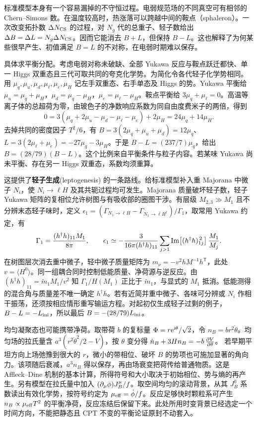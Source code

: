 标准模型本身有一个容易漏掉的不守恒过程。电弱规范场的不同真空可有相邻的 Chern--Simons 数。在温度较高时，热涨落可以跨越中间的鞍点（sphaleron）。一次改变拓扑数 $\Delta N_{\rm CS}$ 的过程，对 $N_g$ 代的总重子、轻子数给出 $\Delta B=\Delta L=N_g\Delta N_{\rm CS}$。因而它能消去 $B+L$，但保持 $B-L$。这也解释了为何某些很早产生、初值满足 $B=L$ 的不对称，在电弱时期难以保存。

具体求平衡分配。考虑电弱对称未破缺、全部 Yukawa 反应与鞍点跃迁都快、单一 Higgs 双重态且三代可取共同的夸克化学势。为简化令各代轻子化学势相同。用 $\mu_q,\mu_u,\mu_d,\mu_\ell,\mu_e,\mu_H$ 记左手双重态、右手单态及 Higgs 的势。Yukawa 平衡给 $\mu_u=\mu_q+\mu_H$，$\mu_d=\mu_q-\mu_H$，$\mu_e=\mu_\ell-\mu_H$。鞍点平衡给 $3\mu_q+\mu_\ell=0$。高温等离子体的总超荷为零，由玻色子的净数响应系数为同自由度费米子的两倍，得到
\[
 0=3(\mu_q+2\mu_u-\mu_d-\mu_\ell-\mu_e)+2\mu_H
   =24\mu_q+14\mu_H .
\]
去掉共同的密度因子 $T^2/6$，有 $B=3(2\mu_q+\mu_u+\mu_d)=12\mu_q$、$L=3(2\mu_\ell+\mu_e)=-27\mu_q-3\mu_H$。于是 $B-L=(237/7)\mu_q$，给出 $B=(28/79)(B-L)$。这个比例来自平衡条件与粒子内容。若某味 Yukawa 尚未平衡、存在另一 Higgs 双重态，系数均须重算。

这提供了\textbf{轻子生成}(leptogenesis) 的一条路线。给标准模型补入重 Majorana 中微子 $N_i$，使 $N_i\to\ell H$ 及其共轭过程均可发生。Majorana 质量破坏轻子数，轻子 Yukawa 矩阵的复相位允许树图与有吸收部的圈图干涉。有层级 $M_{2,3}\gg M_1$ 且不分辨末态轻子味时，定义 $\epsilon_1=(\Gamma_{N_1\to\ell H}-\Gamma_{N_1\to\bar\ell H^\dagger})/\Gamma_1$，取常用 Yukawa 约定，有
\[
 \Gamma_1=\frac{(h^\dagger h)_{11}M_1}{8\pi},\qquad
 \epsilon_1\simeq-\frac{3}{16\pi(h^\dagger h)_{11}}
 \sum_{j>1}{\rm Im}\!\left[(h^\dagger h)_{1j}^{\,2}\right]\frac{M_1}{M_j}.
\]
在树图层次消去重中微子，轻中微子质量矩阵为 $m_\nu=-v^2 h M^{-1}h^{\mathsf T}$，此处 $v=\langle H^0\rangle$。同一组耦合同时控制低能质量、净荷源与逆反应。由 $(h^\dagger h)_{11}=\widetilde m_1 M_1/v^2$ 知 $\Gamma_1/H(M_1)$ 正比于 $\widetilde m_1$，与显式的 $M_1$ 抵消。低能测得的混合角与质量差不唯一确定 $h^\dagger h$。若有近简并重中微子、各味可分辨或 $N_i$ 作相干振荡，还须按相应情形重写输运方程。对起初仅生成轻子过剩的例子，$B-L=-L_{\rm ini}$，所以最后 $B=-(28/79)L_{\rm ini}$。

均匀凝聚态也可能携带净荷。取带荷 $b$ 的复标量 $\Phi=r\mathrm{e}^{\mathrm i\theta}/\sqrt2$，令 $n_B=b r^2\dot\theta$。均匀场的拉氏量含 $a^3(r^2\dot\theta^2/2-V)$，按 $\theta$ 变分得 $\dot n_B+3H n_B=-b\,\frac{\partial V}{\partial\theta}$。
若早期平坦方向上场弛豫到很大的 $r$，微小的带相位、破坏 $B$ 的势项也可施加显著的角向力。该项随后衰减，$a^3 n_B$ 得以保存，再由场衰变把荷传给普通物质。这是 Affleck--Dine 机制的基本计算，所得符号和大小取决于初始相位、势与熵的再产生。另有模型在拉氏量中加入 $(\partial_\mu\phi)J_B^\mu/f$。取空间均匀的滚动背景，从其 $J_B^0$ 系数读出有效化学势，按符号约定为 $\mu_{\rm eff}=\dot\phi/f$。反应足够快时颗粒系可产生 $n_B\propto\mu_{\rm eff}T^2$ 的平衡净荷，反应冻结后保留下来。此处所用时变背景已经选定一个时间方向，不能把静态且 CPT 不变的平衡论证原封不动套入。

